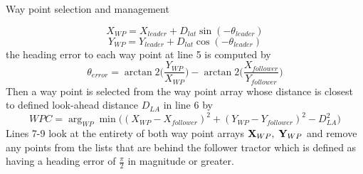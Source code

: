 \begin{algorithm}[h]
\SetAlgoLined
\vspace{5pt}
 \caption{Way point selection and management}\label{alg:WP}
\end{algorithm}
\begin{equation}\label{eq:WPX}
    X_{WP} = X_{leader} + D_{lat}\sin(-\theta_{leader})
\end{equation}
\begin{equation}\label{eq:WPY}
    Y_{WP} = Y_{leader} + D_{lat}\cos(-\theta_{leader})
\end{equation}
the heading error to each way point at line 5 is computed by
\begin{equation}\label{eq:heading_error}
    \theta_{error} = \arctan2\Bigg(\frac{Y_{WP}}{X_{WP}}\Bigg) - \arctan2\Bigg(\frac{X_{follower}}{Y_{follower}}\Bigg)
\end{equation}
Then a way point is selected from the way point array whose distance is closest to defined look-ahead distance $D_{LA}$ in line 6 by
\begin{equation}\label{eq:way_point_selection}
    WPC = \operatorname{arg}_{WP}\operatorname{min} \Big((X_{WP} - X_{follower})^2 + (Y_{WP} - Y_{follower})^2 - D^2_{LA}\Big)
\end{equation}
Lines 7-9 look at the entirety of both way point arrays $\mathbf{X}_{WP},\hspace{1mm}\mathbf{Y}_{WP}$ and remove any points from the lists that are behind the follower tractor which is defined as having a heading error of $\frac{\pi}{2}$ in magnitude or greater.
